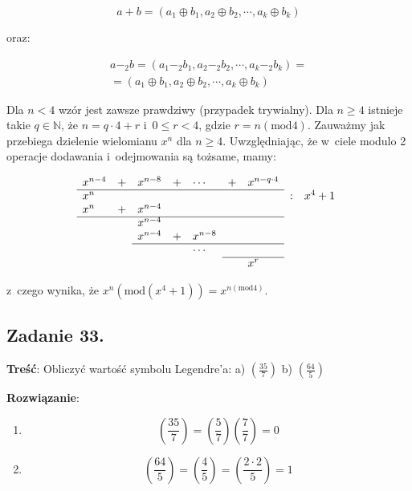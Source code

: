 \documentclass[a4paper,10pt, twocolumn]{article}
\begin{document}
\begin{equation*}
	a + b = (a_{1} \oplus b_{1}, a_{2} \oplus b_{2}, \cdots, a_{k} \oplus b_{k})
\end{equation*}

\noindent oraz:

\begin{equation*}
	\begin{array}{c} a -_{2} b = (a_{1} -_{2} b_{1}, a_{2} -_{2} b_{2}, \cdots, a_{k} -_{2} b_{k}) = \\ = (a_{1} \oplus b_{1}, a_{2} \oplus b_{2}, \cdots, a_{k} \oplus b_{k}) \end{array}
\end{equation*}

\noindent Dla $n < 4$ wzór jest zawsze prawdziwy (przypadek trywialny). Dla $n \geq 4$ istnieje takie $q \in \mathbb{N}$, że $n = q \cdot 4 + r$ i~$0 \leq r < 4$, gdzie $r = n (\text{mod} 4)$. Zauważmy jak przebiega dzielenie wielomianu $x^{n}$ dla $n \geq 4$. Uwzględniając, że w~ciele modulo 2 operacje dodawania i~odejmowania są tożsame, mamy:

\begin{equation*}
	\begin{array}{lllllllll} 
		x^{n-4} & + & x^{n-8} & + & \cdots & + & x^{n-q \cdot 4} & & \\
		\cline{1-7}
		x^{n} & & & & & & & : & x^{4} + 1 \\
		x^{n} & + & x^{n-4} & & & & & & \\
		\cline{1-7}
		& & x^{n-4} & & & & & & \\
		& & x^{n-4} & + & x^{n-8} & & & & \\
		\cline{3-7}
		& & & & \cdots & & & & \\
		\cline{6-7}
		& & & & & & x^{r} & & \\
	\end{array}
\end{equation*}

\noindent z~czego wynika, że $x^{n} (\text{mod}(x^{4} + 1 )) = x^{n(\text{mod}4)}$.

\subsection{Zadanie 33.}
\textbf{Treść}: Obliczyć wartość symbolu Legendre'a: a) $(\frac{35}{7})$ b) $(\frac{64}{5})$

\textbf{Rozwiązanie}:
\begin{enumerate}
 \item{
  \begin{equation*}
   (\frac{35}{7})=(\frac{5}{7})(\frac{7}{7})=0
  \end{equation*}
 }
 \item{
  \begin{equation*}
   (\frac{64}{5})=(\frac{4}{5})=(\frac{2\cdot 2}{5})=1
  \end{equation*}
 }
\end{enumerate}
\end{document}
